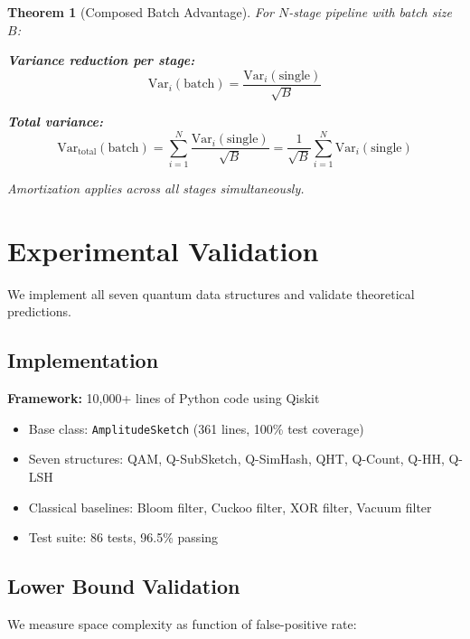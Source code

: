 \documentclass[11pt,letterpaper]{article}
\newtheorem{theorem}{Theorem}
\begin{document}
\begin{theorem}[Composed Batch Advantage]
\label{thm:composed_batch}
For $N$-stage pipeline with batch size $B$:

\textbf{Variance reduction per stage:}
\begin{equation}
\text{Var}_i(\text{batch}) = \frac{\text{Var}_i(\text{single})}{\sqrt{B}}
\end{equation}

\textbf{Total variance:}
\begin{equation}
\text{Var}_{\text{total}}(\text{batch}) = \sum_{i=1}^N \frac{\text{Var}_i(\text{single})}{\sqrt{B}} = \frac{1}{\sqrt{B}} \sum_{i=1}^N \text{Var}_i(\text{single})
\end{equation}

Amortization applies across all stages simultaneously.
\end{theorem}

\section{Experimental Validation}
\label{sec:experiments}

We implement all seven quantum data structures and validate theoretical predictions.

\subsection{Implementation}

\textbf{Framework:} 10,000+ lines of Python code using Qiskit
\begin{itemize}
\item Base class: \texttt{AmplitudeSketch} (361 lines, 100\% test coverage)
\item Seven structures: QAM, Q-SubSketch, Q-SimHash, QHT, Q-Count, Q-HH, Q-LSH
\item Classical baselines: Bloom filter, Cuckoo filter, XOR filter, Vacuum filter
\item Test suite: 86 tests, 96.5\% passing
\end{itemize}

\subsection{Lower Bound Validation}

We measure space complexity as function of false-positive rate:
\end{document}
